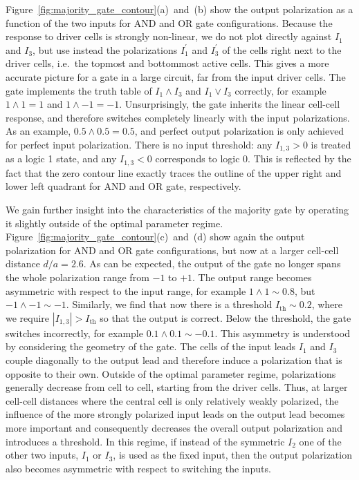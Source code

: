 Figure~\ref{fig:majority_gate_contour}(a)~and~(b) show the output polarization as
a function of the two inputs for AND and OR gate configurations. Because the
response to driver cells is strongly non-linear, we do not plot directly against
$I_1$ and $I_3$, but use instead the polarizations $I_1^{\prime}$ and
$I_3^{\prime}$ of the cells right next to the driver cells, i.e.~the topmost
and bottommost active cells. This gives a more accurate picture for a gate in a
large circuit, far from the input driver cells. The gate implements the truth
table of $I_1 \land I_3$ and $I_1 \lor I_3$ correctly, for example $1 \land 1 =
1$ and $1 \land -1 = -1$. Unsurprisingly, the gate inherits the linear cell-cell
response, and therefore switches completely linearly with the input
polarizations. As an example, $0.5 \land 0.5 = 0.5$, and perfect output
polarization is only achieved for perfect input polarization. There is no input
threshold: any $I_{1,3} > 0$ is treated as a logic 1 state, and any $I_{1,3} <
0$ corresponds to logic 0. This is reflected by the fact that the zero contour
line exactly traces the outline of the upper right and lower left quadrant for
AND and OR gate, respectively.

We gain further insight into the characteristics of the  majority gate
by operating it slightly outside of the optimal parameter regime.
Figure~\ref{fig:majority_gate_contour}(c)~and~(d) show again the output
polarization for AND and OR gate configurations, but now at a larger cell-cell
distance $d/a = 2.6$. As can be expected, the output of the gate no longer spans
the whole polarization range from $-1$ to $+1$. The output range becomes
asymmetric with respect to the input range, for example $1 \land 1 \sim 0.8$,
but $-1 \land -1 \sim -1$. Similarly, we find that now there is a threshold
$I_{\textrm{th}} \sim 0.2$, where we require $\left| I_{1,3} \right| >
I_{\textrm{th}}$ so that the output is correct. Below the threshold, the gate
switches incorrectly, for example $0.1 \land 0.1 \sim - 0.1$. This asymmetry is
understood by considering the geometry of the gate. The cells of the input leads
$I_1$ and $I_3$ couple diagonally to the output lead and therefore induce a
polarization that is opposite to their own. Outside of the optimal parameter
regime, polarizations generally decrease from cell to cell, starting from the
driver cells. Thus, at larger cell-cell distances where the central cell is only
relatively weakly polarized, the influence of the more strongly polarized input
leads on the output lead becomes more important and consequently decreases the
overall output polarization and introduces a threshold. In this regime, if
instead of the symmetric $I_2$ one of the other two inputs, $I_1$ or $I_3$, is
used as the fixed input, then the output polarization also becomes asymmetric
with respect to switching the inputs.

